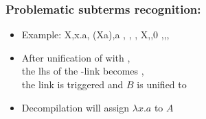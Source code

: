 \documentclass{pres}
\begin{document}
\begin{frame}[fragile]
  \frametitle{Problematic subterms recognition: \maybelam}

  \begin{itemize}
    \item Example: 
      \printAlll
      {{{X,\lambda x.a},
        {(X\appsep a),a}}}
      {{{, },
        {,}}}
      {{{X,,0}}}
      {{{\llambda,,,}}}
    \item After unification of  with , \\
        the lhs of the \llambda-link becomes ,\\
        the link is triggered and $B$ is unified to 
    \item Decompilation will assign $\lambda x.a$ to $A$
  \end{itemize}

\end{frame}


  

\end{document}
